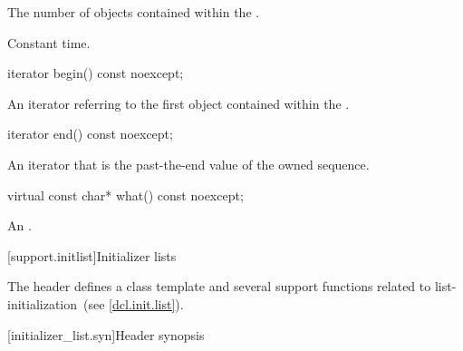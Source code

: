 \begin{itemdescr}
\pnum
\returns
The number of  objects contained within the
.

\pnum
\complexity
Constant time.
\end{itemdescr}

\begin{itemdecl}
iterator begin() const noexcept;
\end{itemdecl}

\begin{itemdescr}
\pnum
\returns
An iterator referring to the first  object contained
within the .
\end{itemdescr}

\begin{itemdecl}
iterator end() const noexcept;
\end{itemdecl}

\begin{itemdescr}
\pnum
\returns
An iterator that is the past-the-end value of the owned sequence.
\end{itemdescr}

\begin{itemdecl}
virtual const char* what() const noexcept;
\end{itemdecl}

\begin{itemdescr}
\pnum
\returns
An  \ntbs.
\end{itemdescr}

[support.initlist]{Initializer lists}

%
%
\pnum
The header  defines a class template and several
support functions related to list-initialization~(see \ref{dcl.init.list}).

[initializer_list.syn]{Header  synopsis}
%
%
%

